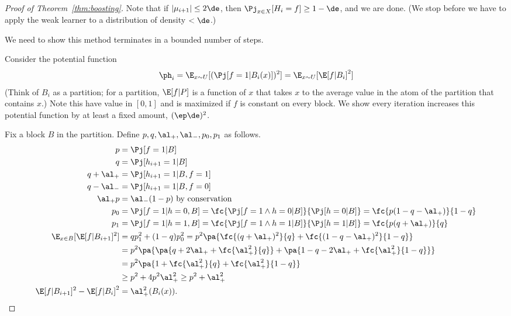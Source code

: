 \begin{proof}[Proof of Theorem~\ref{thm:boosting}]
Note that if $|\mu_{i+1}|\le 2\de$, then $\Pj_{x\in X}[H_i=f]\ge 1-\de$, and we are done. (We stop before we have to apply the weak learner to a distribution of density $<\de$.)

We need to show this method terminates in a bounded number of steps.

Consider the potential function
$$
\ph_i = \E_{x\sim U} [(\Pj[f=1|B_i(x)])^2]
 = \E_{x\sim U} [\E[ f|B_i]^2]
$$
(Think of $B_i$ as a partition; for a partition, $\E[f|P]$ is a function of $x$ that takes $x$ to the average value in the atom of the partition that contains $x$.)
Note this have value in $[0,1]$ and is maximized if $f$ is constant on every block. We show every iteration increases this potential 
function by at least a fixed amount, $(\ep\de)^2$.

Fix a block $B$ in the partition. Define $p,q,\al_+,\al_-,p_0,p_1$ as follows. 
\begin{align}
p&=\Pj[f=1|B]\\
q&=\Pj[h_{i+1} = 1|B]\\ %
q+\al_+ &= \Pj[h_{i+1}=1|B, f=1]\\ %
q-\al_- &= \Pj[h_{i+1}=1|B, f=0]\\ %
\al_+p &= \al_-(1-p) \text{ by conservation}\\
p_0&= \Pj[f=1|h=0,B] = \fc{\Pj[f=1\wedge h=0|B]}{\Pj[h=0|B]} = \fc{p(1-q-\al_+)}{1-q}\\
p_1&= \Pj[f=1|h=1,B] = \fc{\Pj[f=1\wedge h=1|B]}{\Pj[h=1|B]} = \fc{p(q+\al_+)}{q}\\
\E_{x\in B} [\E[f|B_{i+1}]^2]&=qp_1^2 + (1-q)p_0^2 = p^2 \pa{\fc{(q+\al_+)^2}{q} + \fc{(1-q-\al_+)^2}{1-q}} \\
&=p^2\pa{
\pa{q+2\al_+ + \fc{\al_+^2}{q}}
+
\pa{1-q-2\al_+ + \fc{\al_+^2}{1-q}}
}
\\
&=p^2\pa{1+\fc{\al_+^2}{q} + \fc{\al_+^2}{1-q}}\\
&\ge p^2 + 4p^2 \al_+^2 \ge
p^2+
 \al_+^2\\
\E[f|B_{i+1}]^2 - \E[f|B_i]^2%
&=\al_+^2(B_i(x)).
\end{align}


\end{proof}
